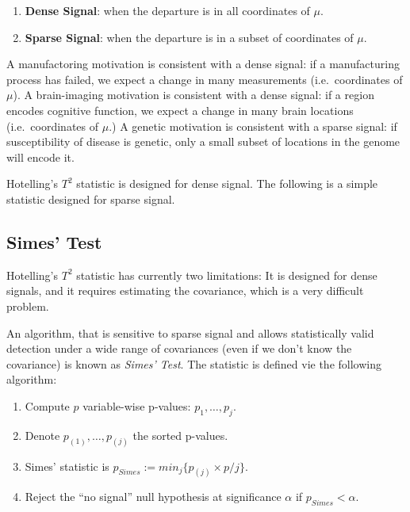 \documentclass[]{book}
\providecommand{\tightlist}{%
  \setlength{\itemsep}{0pt}\setlength{\parskip}{0pt}}
\theoremstyle{definition}
\theoremstyle{definition}
\theoremstyle{definition}
\theoremstyle{remark}
\begin{document}
\begin{enumerate}
\def\labelenumi{\arabic{enumi}.}
\tightlist
\item
  \textbf{Dense Signal}: when the departure is in all coordinates of \(\mu\).
\item
  \textbf{Sparse Signal}: when the departure is in a subset of coordinates of \(\mu\).
\end{enumerate}

A manufactoring motivation is consistent with a dense signal: if a manufacturing process has failed, we expect a change in many measurements (i.e.~coordinates of \(\mu\)).
A brain-imaging motivation is consistent with a dense signal: if a region encodes cognitive function, we expect a change in many brain locations (i.e.~coordinates of \(\mu\).)
A genetic motivation is consistent with a sparse signal: if susceptibility of disease is genetic, only a small subset of locations in the genome will encode it.

Hotelling's \(T^2\) statistic is designed for dense signal.
The following is a simple statistic designed for sparse signal.

\hypertarget{simes-test}{%
\subsection{Simes' Test}\label{simes-test}}

Hotelling's \(T^2\) statistic has currently two limitations: It is designed for dense signals, and it requires estimating the covariance, which is a very difficult problem.

An algorithm, that is sensitive to sparse signal and allows statistically valid detection under a wide range of covariances (even if we don't know the covariance) is known as \emph{Simes' Test}.
The statistic is defined vie the following algorithm:

\begin{enumerate}
\def\labelenumi{\arabic{enumi}.}
\tightlist
\item
  Compute \(p\) variable-wise p-values: \(p_1,\dots,p_j\).
\item
  Denote \(p_{(1)},\dots,p_{(j)}\) the sorted p-values.
\item
  Simes' statistic is \(p_{Simes}:=min_j\{p_{(j)} \times p/j\}\).
\item
  Reject the ``no signal'' null hypothesis at significance \(\alpha\) if \(p_{Simes}<\alpha\).
\end{enumerate}
\end{document}
